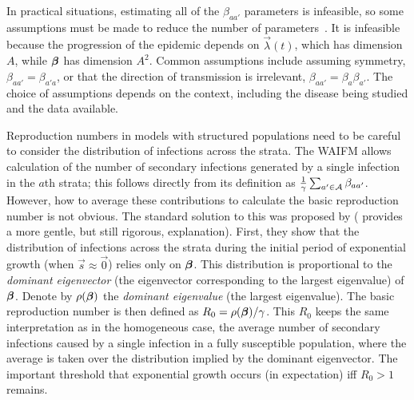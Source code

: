 \documentclass[thesis.tex]{subfiles}
\begin{document}
In practical situations, estimating all of the $\beta_{aa'}$ parameters is infeasible, so some assumptions must be made to reduce the number of parameters~\autocite[176]{andersonInfectious}.
It is infeasible because the progression of the epidemic depends on $\vec{\lambda}(t)$, which has dimension $A$, while $\bm{\beta}$ has dimension $A^2$.
Common assumptions include assuming symmetry, \ie $\beta_{aa'} = \beta_{a'a}$, or that the direction of transmission is irrelevant, \ie $\beta_{aa'} = \beta_{a} \beta_{a'}$.
The choice of assumptions depends on the context, including the disease being studied and the data available.

Reproduction numbers in models with structured populations need to be careful to consider the distribution of infections across the strata.
The WAIFM allows calculation of the number of secondary infections generated by a single infection in the $a$th strata; this follows directly from its definition as $\frac{1}{\gamma} \sum_{a' \in \mathcal{A}} \beta_{aa'}$. 
However, how to average these contributions to calculate the basic reproduction number is not obvious.
The standard solution to this was proposed by \textcite{diekmannDefinition} (\textcite[chapter 7]{diekmannMathematical} provides a more gentle, but still rigorous, explanation).
First, they show that the distribution of infections across the strata during the initial period of exponential growth (when $\vec{s} \approx \vec{0}$) relies only on $\bm{\beta}$.
This distribution is proportional to the \emph{dominant eigenvector} (the eigenvector corresponding to the largest eigenvalue) of $\bm{\beta}$.
Denote by $\rho(\bm{\beta})$ the \emph{dominant eigenvalue} (the largest eigenvalue).
The basic reproduction number is then defined as $R_0 = \rho(\bm{\beta}) / \gamma$.
This $R_0$ keeps the same interpretation as in the homogeneous case, \ie the average number of secondary infections caused by a single infection in a fully susceptible population, where the average is taken over the distribution implied by the dominant eigenvector.
The important threshold that exponential growth occurs (in expectation) iff $R_0 > 1$ remains.
\end{document}
